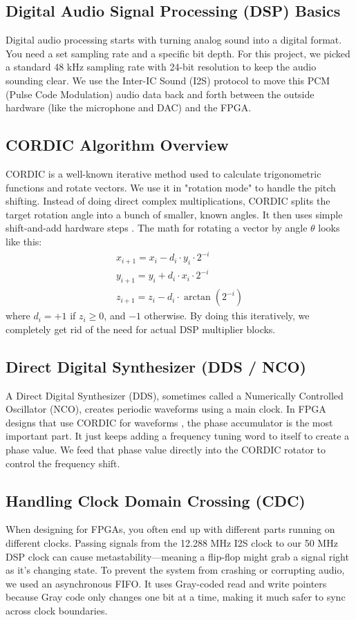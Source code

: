 \documentclass[runningheads]{llncs}
\begin{document}
\subsection{Digital Audio Signal Processing (DSP) Basics}
Digital audio processing starts with turning analog sound into a digital format. You need a set sampling rate and a specific bit depth. For this project, we picked a standard 48 kHz sampling rate with 24-bit resolution to keep the audio sounding clear. We use the Inter-IC Sound (I2S) protocol to move this PCM (Pulse Code Modulation) audio data back and forth between the outside hardware (like the microphone and DAC) and the FPGA.
\subsection{CORDIC Algorithm Overview}
CORDIC is a well-known iterative method used to calculate trigonometric functions and rotate vectors. We use it in "rotation mode" to handle the pitch shifting. Instead of doing direct complex multiplications, CORDIC splits the target rotation angle into a bunch of smaller, known angles. It then uses simple shift-and-add hardware steps \cite{ref_andraka}. The math for rotating a vector by angle $\theta$ looks like this:
\begin{equation}
\begin{array}{l}
x_{i+1} = x_i - d_i \cdot y_i \cdot 2^{-i} \\
y_{i+1} = y_i + d_i \cdot x_i \cdot 2^{-i} \\
z_{i+1} = z_i - d_i \cdot \arctan(2^{-i})
\end{array}
\end{equation}
where $d_i = +1$ if $z_i \ge 0$, and $-1$ otherwise. By doing this iteratively, we completely get rid of the need for actual DSP multiplier blocks.
\subsection{Direct Digital Synthesizer (DDS / NCO)}
A Direct Digital Synthesizer (DDS), sometimes called a Numerically Controlled Oscillator (NCO), creates periodic waveforms using a main clock. In FPGA designs that use CORDIC for waveforms \cite{ref_soumya}, the phase accumulator is the most important part. It just keeps adding a frequency tuning word to itself to create a phase value. We feed that phase value directly into the CORDIC rotator to control the frequency shift.
\subsection{Handling Clock Domain Crossing (CDC)}
When designing for FPGAs, you often end up with different parts running on different clocks. Passing signals from the 12.288 MHz I2S clock to our 50 MHz DSP clock can cause metastability—meaning a flip-flop might grab a signal right as it's changing state. To prevent the system from crashing or corrupting audio, we used an asynchronous FIFO. It uses Gray-coded read and write pointers because Gray code only changes one bit at a time, making it much safer to sync across clock boundaries.
\end{document}
